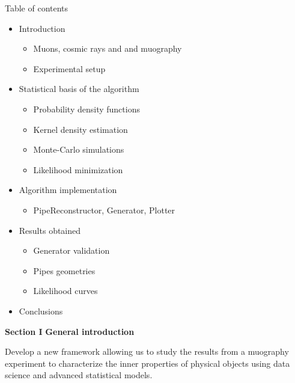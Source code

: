 \documentclass[8 pt]{beamer}
\begin{document}
\begin{frame}{Table of contents}

	\begin{itemize}
		\item Introduction
		\begin{itemize}
			\item Muons, cosmic rays and and muography
			\item Experimental setup
		\end{itemize} \vfill
		\item Statistical basis of the algorithm
		\begin{itemize}
			\item Probability density functions
			\item Kernel density estimation
			\item Monte-Carlo simulations
			\item Likelihood minimization
		\end{itemize} \vfill
		\item Algorithm implementation
		\begin{itemize}
			\item PipeReconstructor, Generator, Plotter
		\end{itemize} \vfill
		\item Results obtained
		\begin{itemize}
			\item Generator validation
			\item Pipes geometries
			\item Likelihood curves
		\end{itemize} \vfill
		\item Conclusions \vfill
	\end{itemize}

\end{frame}






\begin{frame}{}
	\centering
	\huge{\textbf{\color{mycolor} Section I}} \newline
	\LARGE{\textbf{\color{mycolor} General introduction \color{black}}} \vfill
	
	\LARGE{\textbf{\color{black} \color{black}}}\newline \vspace{10pt} \Large{Develop a new framework allowing us to study the results from a muography experiment to characterize the inner properties of physical objects using data science and advanced statistical models.} \vfill
\end{frame}
\end{document}

